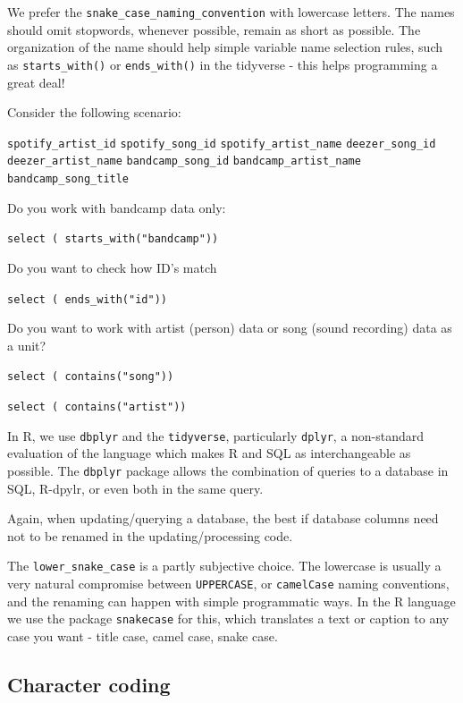 \documentclass[
  fontsize=13pt,
  english,
  a4paper,
  openany, a4paper, oneside]{book}
\begin{document}
We prefer the \texttt{snake\_case\_naming\_convention} with lowercase letters. The names should omit stopwords, whenever possible, remain as short as possible. The organization of the name should help simple variable name selection rules, such as \texttt{starts\_with()} or \texttt{ends\_with()} in the tidyverse - this helps programming a great deal!

Consider the following scenario:

\texttt{spotify\_artist\_id}
\texttt{spotify\_song\_id}
\texttt{spotify\_artist\_name}
\texttt{deezer\_song\_id}
\texttt{deezer\_artist\_name}
\texttt{bandcamp\_song\_id}
\texttt{bandcamp\_artist\_name}
\texttt{bandcamp\_song\_title}

Do you work with bandcamp data only:

\texttt{select\ (\ starts\_with("bandcamp"))}

Do you want to check how ID's match

\texttt{select\ (\ ends\_with("id"))}

Do you want to work with artist (person) data or song (sound recording) data as a unit?

\texttt{select\ (\ contains("song"))}

\texttt{select\ (\ contains("artist"))}

In R, we use \texttt{dbplyr} and the \texttt{tidyverse}, particularly \texttt{dplyr}, a non-standard evaluation of the language which makes R and SQL as interchangeable as possible. The \texttt{dbplyr} package allows the combination of queries to a database in SQL, R-dpylr, or even both in the same query.

Again, when updating/querying a database, the best if database columns need not to be renamed in the updating/processing code.

The \texttt{lower\_snake\_case} is a partly subjective choice. The lowercase is usually a very natural compromise between \texttt{UPPERCASE}, or \texttt{camelCase} naming conventions, and the renaming can happen with simple programmatic ways. In the R language we use the package \texttt{snakecase} for this, which translates a text or caption to any case you want - title case, camel case, snake case.

\hypertarget{character-coding}{%
\subsection{Character coding}\label{character-coding}}
\end{document}
